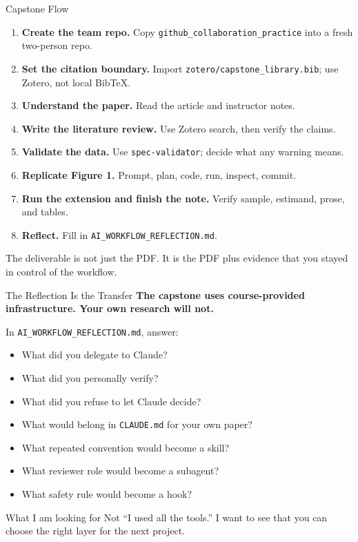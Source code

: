 \documentclass[aspectratio=169, 11pt]{beamer}
\begin{document}
\begin{frame}{Capstone Flow}
  \begin{enumerate}
    \item \textbf{Create the team repo.} Copy \texttt{github\_collaboration\_practice} into a fresh two-person repo.
    \item \textbf{Set the citation boundary.} Import \texttt{zotero/capstone\_library.bib}; use Zotero, not local BibTeX.
    \item \textbf{Understand the paper.} Read the article and instructor notes.
    \item \textbf{Write the literature review.} Use Zotero search, then verify the claims.
    \item \textbf{Validate the data.} Use \texttt{spec-validator}; decide what any warning means.
    \item \textbf{Replicate Figure 1.} Prompt, plan, code, run, inspect, commit.
    \item \textbf{Run the extension and finish the note.} Verify sample, estimand, prose, and tables.
    \item \textbf{Reflect.} Fill in \texttt{AI\_WORKFLOW\_REFLECTION.md}.
  \end{enumerate}

  \vspace{0.6em}
  \alert{\small The deliverable is not just the PDF. It is the PDF plus evidence that you stayed in control of the workflow.}
\end{frame}

\begin{frame}{The Reflection Is the Transfer}
  \textbf{The capstone uses course-provided infrastructure. Your own research will not.}

  \vspace{0.6em}
  In \texttt{AI\_WORKFLOW\_REFLECTION.md}, answer:

  \vspace{0.4em}
  \begin{itemize}\small
    \item What did you delegate to Claude?
    \item What did you personally verify?
    \item What did you refuse to let Claude decide?
    \item What would belong in \texttt{CLAUDE.md} for your own paper?
    \item What repeated convention would become a skill?
    \item What reviewer role would become a subagent?
    \item What safety rule would become a hook?
  \end{itemize}

  \vspace{0.5em}
  \begin{block}{What I am looking for}
    Not ``I used all the tools.'' I want to see that you can choose the right layer for the next project.
  \end{block}
\end{frame}
\end{document}
